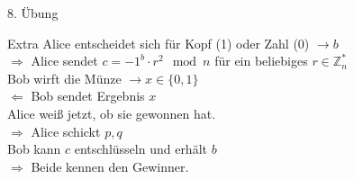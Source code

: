 \begin{section}{8. Übung}
\begin{subsection}{Extra}
  Alice entscheidet sich für Kopf (1) oder Zahl (0) $\rightarrow b$\\
  $\Rightarrow$ Alice sendet $c = -1^b \cdot r^2 \mod n $ für ein beliebiges $r\in \mathbb{Z}_n^*$\\
  Bob wirft die Münze $\rightarrow x \in \{0,1\}$\\
  $\Leftarrow$ Bob sendet Ergebnis $x$ \\
  Alice weiß jetzt, ob sie gewonnen hat.\\
  $\Rightarrow$ Alice schickt $p,q$\\
  Bob kann $c$ entschlüsseln und erhält $b$\\
  $\Rightarrow$ Beide kennen den Gewinner.
 \end{subsection}
\end{section}
